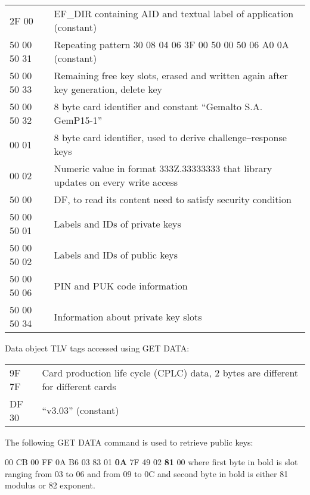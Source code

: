\documentclass[a4paper]{article}
\begin{document}
\begin{tabular}{ l l }   

2F 00           & EF\_DIR containing AID and textual label of application (constant) \\

50 00 50 31     & Repeating pattern 30 08 04 06 3F 00 50 00 50 06 A0 0A (constant) \\

50 00 50 33     & Remaining free key slots, erased and written again after key generation, delete key \\

50 00 50 32     & 8 byte card identifier and constant ``Gemalto S.A. GemP15-1'' \\

00 01           & 8 byte card identifier, used to derive challenge--response keys \\

00 02           & Numeric value in format 333Z.33333333 that library updates on every write access \\

50 00           & DF, to read its content need to satisfy security condition \\

50 00 50 01     & Labels and IDs of private keys \\

50 00 50 02     & Labels and IDs of public keys \\

50 00 50 06     & PIN and PUK code information \\

50 00 50 34     & Information about private key slots \\

\end{tabular}

Data object TLV tags accessed using GET DATA:

\begin{tabular}{ l l }
9F 7F & Card production life cycle (CPLC) data, 2 bytes are different for different cards \\
DF 30 & ``v3.03'' (constant) \\
\end{tabular}

The following GET DATA command is used to retrieve public keys:

00 CB 00 FF 0A B6 03 83 01 \textbf{0A} 7F 49 02 \textbf{81} 00 where first byte in bold is slot ranging from 03 to 06 and from 09 to 0C and second byte in bold is either 81 modulus or 82 exponent.
\end{document}
